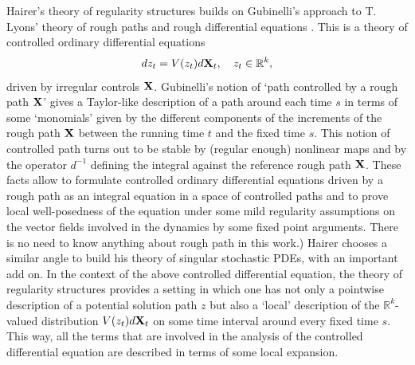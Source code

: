 \documentclass[10pt, reqno]{amsart}
\numberwithin{subsection}{section}
\numberwithin{subsubsection}{subsection}
\numberwithin{equation}{section} %
\theoremstyle{mystyle}
\theoremstyle{mystyle2}
\theoremstyle{mystyle3}
\newcommand\bbR{\mathbb{R}}
\begin{document}
Hairer's theory of regularity structures builds on Gubinelli's approach \cite{GubinelliControlled} to T. Lyons' theory of rough paths and rough differential equations \cite{Lyons98}. This is a theory of controlled ordinary differential equations 
$$
dz_t = V(z_t) d{\bf X}_t,\quad z_t\in\bbR^k,
$$
driven by irregular controls $\bf X$. Gubinelli's notion of `path controlled by a rough path $\bf X$' gives a Taylor-like description of a path around each time $s$ in terms of some `monomials' given by the different components of the increments of the rough path $\bf X$ between the running time $t$ and the fixed time $s$. This notion of controlled path turns out to be stable by (regular enough) nonlinear maps and by the operator $d^{-1}$ defining the integral against the reference rough path $\bf X$. These facts allow to formulate controlled ordinary differential equations driven by a rough path as an integral equation in a space of controlled paths and to prove local well-posedness of the equation under some mild regularity assumptions on the vector fields involved in the dynamics by some fixed point arguments. There is no need to know anything about rough path in this work.) Hairer chooses a similar angle to build his theory of singular stochastic PDEs, with an important add on. In the context of the above controlled differential equation, the theory of regularity structures provides a setting in which one has not only a pointwise description of a potential solution path $z$ but also a `local' description of the $\bbR^k$-valued distribution $V(z_t)d{\bf X}_t$ on some time interval around every fixed time $s$. This way, all the terms that are involved in the analysis of the controlled differential equation are described in terms of some local expansion.
\end{document}
